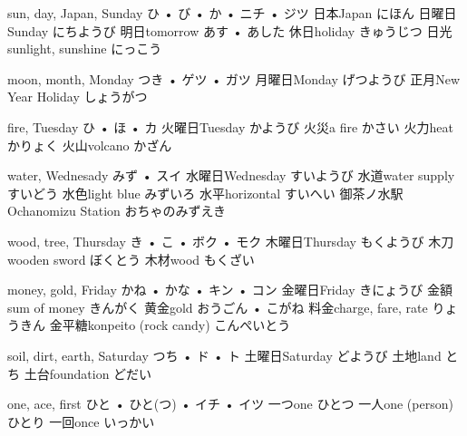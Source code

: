 



\setcounter{cardnum}{1}

		{sun, day, Japan, Sunday}
		{ひ • び • か • ニチ • ジツ}
		{日本}{Japan にほん}
		{日曜日}{Sunday にちようび}
		{明日}{tomorrow あす • あした}
		{休日}{holiday きゅうじつ}
		{日光}{sunlight, sunshine にっこう}

		{moon, month, Monday}
		{つき • ゲツ • ガツ}
		{月曜日}{Monday げつようび}
		{正月}{New Year Holiday しょうがつ}
		{}{}
		{}{}
		{}{}

		{fire, Tuesday}
		{ひ • ほ • カ}
		{火曜日}{Tuesday かようび}
		{火災}{a fire かさい}
		{火力}{heat かりょく}
		{火山}{volcano かざん}
		{}{}

		{water, Wednesady}
		{みず • スイ}
		{水曜日}{Wednesday すいようび}
		{水道}{water supply すいどう}
		{水色}{light blue みずいろ}
		{水平}{horizontal すいへい}
		{御茶ノ水駅}{Ochanomizu Station おちゃのみずえき}

		{wood, tree, Thursday}
		{き • こ • ボク • モク}
		{木曜日}{Thursday もくようび}
		{木刀}{wooden sword ぼくとう}
		{木材}{wood もくざい}
		{}{}
		{}{}

		{money, gold, Friday}
		{かね • かな • キン • コン}
		{金曜日}{Friday きにょうび}
		{金額}{sum of money きんがく}
		{黄金}{gold おうごん • こがね}
		{料金}{charge, fare, rate りょうきん}
		{金平糖}{konpeito (rock candy) こんぺいとう}

		{soil, dirt, earth, Saturday}
		{つち • ド • ト}
		{土曜日}{Saturday どようび}
		{土地}{land とち}
		{土台}{foundation どだい}
		{}{}
		{}{}

		{one, ace, first}
		{ひと • ひと(つ) • イチ • イツ}
		{一つ}{one ひとつ}
		{一人}{one (person) ひとり}
		{一回}{once いっかい}
		{}{}
		{}{}

